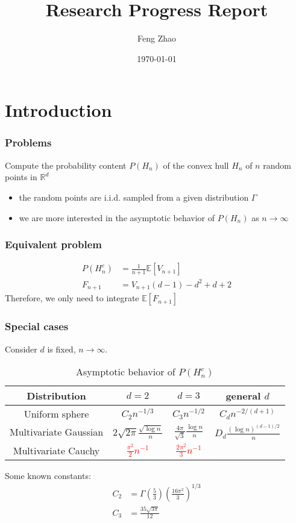 \documentclass{beamer}
\title{Research Progress Report}
\author{Feng Zhao}
\date{\today}
\begin{document}
\begin{frame}
	\titlepage
\end{frame}


\section{Introduction}

\begin{frame}
\frametitle{Problems}
Compute the probability content $P(H_n)$ of the convex hull $H_n$
of $n$ random points in $\mathbb{R}^d$
\begin{itemize}
\item the random points are i.i.d. sampled from a given distribution $\Gamma$
\item we are more interested in the asymptotic behavior of $P(H_n)$
as $n\to\infty$
\end{itemize}
\end{frame}
\begin{frame}
	\frametitle{Equivalent problem}
    \begin{align}
        P(H_n^c) & = \frac{1}{n+1}\mathbb{E}[V_{n+1}]\\
        F_{n+1} & = V_{n+1} (d-1) - d^2 + d + 2
    \end{align}   
    Therefore, we only need to integrate
    $\mathbb{E}[F_{n+1}]$
\end{frame}   
\begin{frame}
    \frametitle{Special cases}
    Consider $d$ is fixed, $n\to \infty$.
    \begin{table}
        \begin{tabular}{|c|c|c|c|}
            \hline
            Distribution & $d=2$ & $d=3$ &  general $d$ \\
            \hline
            Uniform sphere & $C_2 n^{-1/3}$ & $C_3 n^{-1/2}$ &
            $C_{d} n^{-2/(d+1)}$ \\
            \hline
            Multivariate Gaussian &
            $2\sqrt{2\pi}\frac{\sqrt{\log n}}{n}$
            & $\frac{4\pi}{\sqrt{3}}\frac{\log n}{n}$ & $D_d\frac{(\log n)^{(d-1)/2}}{n}$ \\
            \hline
            Multivariate Cauchy & 
            \textcolor{red}{$\frac{\pi^2}{2}n^{-1}$} &
            \textcolor{red}{$\frac{2\pi^2}{3}n^{-1}$} &\\
            \hline
        \end{tabular}
        \caption{Asymptotic behavior of $P(H_n^c)$}
    \end{table}
    Some known constants:
    \begin{align*}
    C_2 &= \Gamma\left(\frac{5}{3}\right) \left(\frac{16\pi^2}{3}
    \right)^{1/3} \\
    C_3 &= \frac{35\sqrt{3\pi}}{12}
    \end{align*}
\end{frame}
\end{document}

